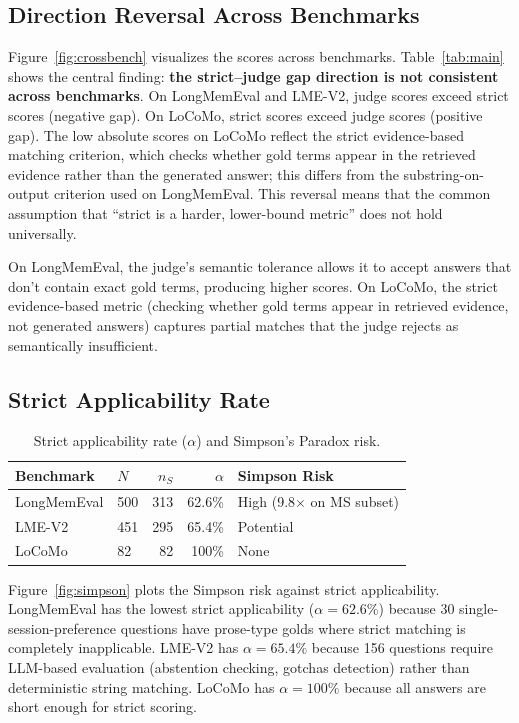 \documentclass{article}
\begin{document}
\subsection{Direction Reversal Across Benchmarks}
Figure~\ref{fig:crossbench} visualizes the scores across benchmarks. Table~\ref{tab:main} shows the central finding: \textbf{the strict--judge gap direction is not consistent across benchmarks}. On LongMemEval and LME-V2, judge scores exceed strict scores (negative gap). On LoCoMo, strict scores exceed judge scores (positive gap). The low absolute scores on LoCoMo reflect the strict evidence-based matching criterion, which checks whether gold terms appear in the retrieved evidence rather than the generated answer; this differs from the substring-on-output criterion used on LongMemEval. This reversal means that the common assumption that ``strict is a harder, lower-bound metric'' does not hold universally.

On LongMemEval, the judge's semantic tolerance allows it to accept answers that don't contain exact gold terms, producing higher scores. On LoCoMo, the strict evidence-based metric (checking whether gold terms appear in retrieved evidence, not generated answers) captures partial matches that the judge rejects as semantically insufficient.

\subsection{Strict Applicability Rate}
\begin{table}[h]
\centering
\caption{Strict applicability rate ($\alpha$) and Simpson's Paradox risk.}
\label{tab:alpha}
\begin{tabular}{llrrl}
\toprule
Benchmark & $N$ & $n_S$ & $\alpha$ & Simpson Risk \\
\midrule
LongMemEval & 500 & 313 & 62.6\% & High (9.8$\times$ on MS subset) \\
LME-V2 & 451 & 295 & 65.4\% & Potential \\
LoCoMo & 82 & 82 & 100\% & None \\
\bottomrule
\end{tabular}
\end{table}

Figure~\ref{fig:simpson} plots the Simpson risk against strict applicability. LongMemEval has the lowest strict applicability ($\alpha = 62.6\%$) because 30 single-session-preference questions have prose-type golds where strict matching is completely inapplicable. LME-V2 has $\alpha = 65.4\%$ because 156 questions require LLM-based evaluation (abstention checking, gotchas detection) rather than deterministic string matching. LoCoMo has $\alpha = 100\%$ because all answers are short enough for strict scoring.
\end{document}
